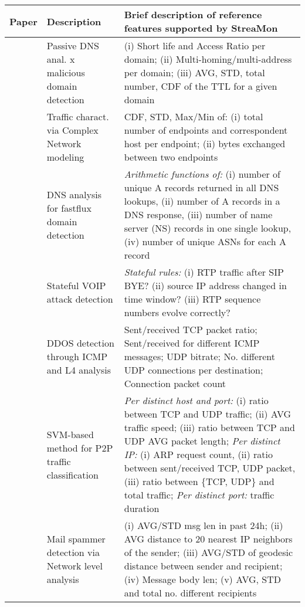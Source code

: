 \documentclass[conference,letterpaper]{sig-alternate-10pt}
\begin{document}
\begin{table*}[t]
\hfill{}
\begin{footnotesize}
\begin{tabular}{| l | p{3.7cm}| p{11.8cm}|}
\hline
\textbf{Paper}&\textbf{Description}&\textbf{Brief description of reference features supported by StreaMon}\\
\hline
\cite{exposure}&Passive DNS anal. x malicious domain detection&(i) Short life and Access Ratio per domain; (ii) Multi-homing/multi-address per domain; (iii) AVG, STD, total number, CDF of the TTL for a given domain\\
\hline
\cite{complex}&Traffic charact. via Complex Network modeling&CDF, STD, Max/Min of: (i) total number of endpoints and correspondent host per endpoint; (ii) bytes exchanged between two endpoints\\
\hline
\cite{fastflux}&DNS analysis for fastflux domain detection&\textit{Arithmetic functions of:} (i) number of unique A records returned in all DNS lookups, (ii) number of A records in a DNS response, (iii) number of name server (NS) records in one single lookup, (iv) number of unique ASNs for each A record\\
\hline
\cite{scidive}&Stateful VOIP attack detection&\textit{Stateful rules:} (i) RTP traffic after SIP BYE? (ii)  source IP address changed in time window? (iii) RTP sequence numbers evolve correctly?\\
\hline
\cite{ddos02}&DDOS detection through ICMP and L4 analysis&Sent/received TCP packet ratio; Sent/received for different ICMP messages; UDP bitrate; No. different UDP connections per destination; Connection packet count\\
\hline
\cite{p2pSVM}&SVM-based method for P2P traffic classification&\textit{Per distinct host and port:} (i) ratio between TCP and UDP traffic; (ii) AVG traffic speed; (iii) ratio between TCP and UDP AVG packet length; \textit{Per distinct IP:} (i) ARP request count, (ii) ratio between sent/received {TCP, UDP} packet, (iii) ratio between \{TCP, UDP\} and total traffic; \textit{Per distinct port:} traffic duration\\
\hline
\cite{snare}&Mail spammer detection via Network level analysis& (i) AVG/STD msg len in past 24h; (ii) AVG distance to 20 nearest IP neighbors of the sender; (iii) AVG/STD of geodesic distance between sender and recipient; (iv) Message body len; (v) AVG, STD and total no. different recipients\\
\hline
\end{tabular}
\end{footnotesize}
\caption{}
\label{tab:features}
\end{table*}
\end{document}
